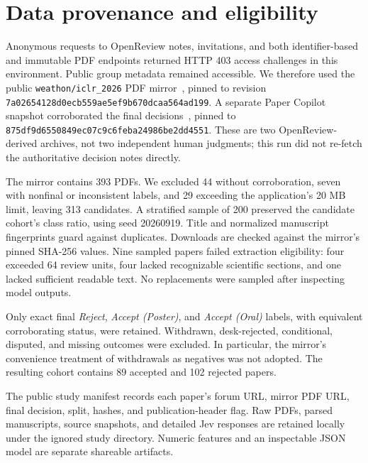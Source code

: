 \documentclass[11pt]{article}
\begin{document}
\section{Data provenance and eligibility}
Anonymous requests to OpenReview notes, invitations, and both identifier-based and immutable PDF endpoints returned HTTP 403 access challenges in this environment. Public group metadata remained accessible. We therefore used the public \texttt{weathon/iclr\_2026} PDF mirror~\cite{mirror}, pinned to revision \texttt{7a02654128d0ecb559ae5ef9b670dcaa564ad199}. A separate Paper Copilot snapshot corroborated the final decisions~\cite{copilot}, pinned to \texttt{875df9d6550849ec07c9c6feba24986be2dd4551}. These are two OpenReview-derived archives, not two independent human judgments; this run did not re-fetch the authoritative decision notes directly.

The mirror contains 393 PDFs. We excluded 44 without corroboration, seven with nonfinal or inconsistent labels, and 29 exceeding the application's 20 MB limit, leaving 313 candidates. A stratified sample of 200 preserved the candidate cohort's class ratio, using seed 20260919. Title and normalized manuscript fingerprints guard against duplicates. Downloads are checked against the mirror's pinned SHA-256 values. Nine sampled papers failed extraction eligibility: four exceeded 64 review units, four lacked recognizable scientific sections, and one lacked sufficient readable text. No replacements were sampled after inspecting model outputs.

Only exact final \emph{Reject}, \emph{Accept (Poster)}, and \emph{Accept (Oral)} labels, with equivalent corroborating status, were retained. Withdrawn, desk-rejected, conditional, disputed, and missing outcomes were excluded. In particular, the mirror's convenience treatment of withdrawals as negatives was not adopted. The resulting cohort contains 89 accepted and 102 rejected papers.

\begin{table}[ht]
\centering\StudySplitTable
\caption{Frozen, stratified manuscript splits. No manuscript or normalized-text duplicate crosses a split.}
\end{table}

The public study manifest records each paper's forum URL, mirror PDF URL, final decision, split, hashes, and publication-header flag. Raw PDFs, parsed manuscripts, source snapshots, and detailed Jev responses are retained locally under the ignored study directory. Numeric features and an inspectable JSON model are separate shareable artifacts.
\end{document}
